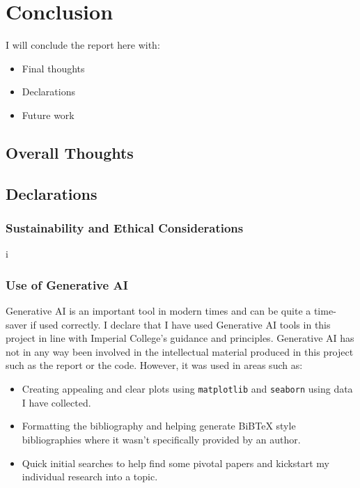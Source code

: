 \chapter{Conclusion}
I will conclude the report here with:
\begin{itemize}
  \item Final thoughts
  \item Declarations
  \item Future work
\end{itemize}

\section{Overall Thoughts}


\section{Declarations}
  \subsection{Sustainability and Ethical Considerations}i

  \subsection{Use of Generative AI}
  Generative AI is an important tool in modern times and can be quite a time-saver if used correctly. 
  I declare that I have used Generative AI tools in this project in line with Imperial College's guidance and principles. Generative AI has not in any way been involved in the intellectual material produced in this project such as the report or the code. However, it was used in areas such as:
  \begin{itemize}
    \item Creating appealing and clear plots using \verb|matplotlib| and \verb|seaborn|  using data I have collected.
    \item Formatting the bibliography and helping generate BiBTeX style bibliographies where it wasn't specifically provided by an author.
    \item Quick initial searches to help find some pivotal papers and kickstart my individual research into a topic.
  \end{itemize}

